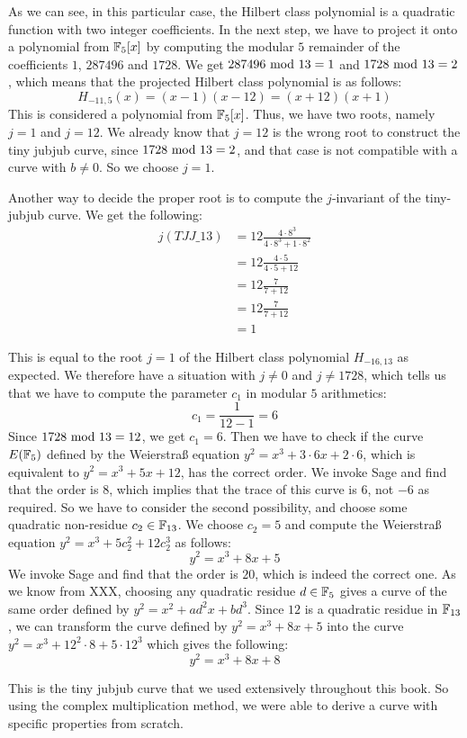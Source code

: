 \begin{example}
As we can see, in this particular case, the Hilbert class polynomial is a quadratic function with two integer coefficients. In the next step, we have to project it onto a polynomial from $\mathbb{F}_5[x]$ by computing the modular $5$ remainder of the coefficients $1$, $287496$ and $1728$. We get $287496 \text{ mod } 13=1$ and $1728 \text{ mod } 13=2$, which means that the projected Hilbert class polynomial is as follows:
$$
H_{-11,5}(x)=(x-1)(x-12)= (x+12)(x+1)
$$ 
This is considered a polynomial from $\mathbb{F}_5[x]$. Thus, we have two roots, namely $j=1$ and $j=12$. We already know that $j=12$ is the wrong root to construct the tiny jubjub curve, since $1728 \text{ mod } 13=2$, and that case is not compatible with a curve with $b\neq 0$. So we choose $j=1$.

Another way to decide the proper root is to compute the $j$-invariant of the tiny-jubjub curve. We get the following:
\begin{align*}
j(\mathit{TJJ\_13}) & = 12\frac{4\cdot 8^3}{4\cdot 8^3+ 1\cdot 8^2}\\
                    & = 12\frac{4\cdot 5}{4\cdot 5+ 12}\\
                    & = 12\frac{7}{7+ 12}\\
                    & = 12\frac{7}{7+ 12}\\
                    & = 1
\end{align*}

This is equal to the root $j=1$ of the Hilbert class polynomial $H_{-16,13}$ as expected. We therefore have a situation with $j\neq 0$ and $j\neq 1728$, which tells us that we have to compute the parameter $c_1$ in modular $5$ arithmetics:
$$
c_1=\frac{1}{12-1} = 6
$$
Since $1728 \text{ mod } 13=12$, we get $c_1=6$. Then we have to check if the curve $E(\mathbb{F}_5)$ defined by the Weierstraß  equation $y^2 = x^3 + 3\cdot 6 x + 2\cdot 6$, which is equivalent to
$
y^2 = x^3 + 5x +12
$, has the correct order. We invoke Sage and find that the order is $8$, which implies that the trace of this curve is $6$, not $-6$ as required. So we have to consider the second possibility, and choose some quadratic non-residue $c_2\in\mathbb{F}_{13}$. We choose $c_2=5$ and compute the Weierstraß equation $y^2 = x^3 + 5 c_2^2 + 12 c_2^3$ as follows:
$$
y^2 = x^3 + 8 x + 5
$$
We invoke Sage and find that the order is $20$, which is indeed the correct one. As we know from XXX, choosing any quadratic residue $d\in \mathbb{F}_5$ gives a curve of the same order defined by $y^2 = x^2 + a d^2 x + bd^3$. Since $12$ is a quadratic residue in $\mathbb{F}_{13}$, we can transform the curve defined by 
$y^2 = x^3 +8x+5$ into the curve $y^2 = x^3 + 12^2\cdot 8 + 5\cdot 12^3$ which gives the following:
$$
y^2 = x^3 + 8x +8
$$

This is the tiny jubjub curve that we used extensively throughout this book. So using the complex multiplication method, we were able to derive a curve with specific properties from scratch.
\end{example}

